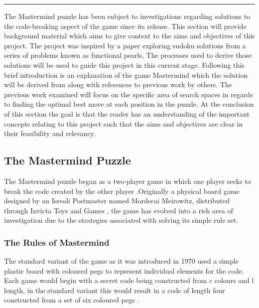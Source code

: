 
\rule{\textwidth}{2pt}

The Mastermind puzzle has been subject to investigations regarding solutions to the code-breaking aspect of the game
since its release.
This section will provide background material which aims to give context to the aims and objectives of this project.
The project was inspired by a paper exploring sudoku solutions from a series of problems known as functional pearls,
The processes used to derive those solutions will be used to guide this project in this current stage.
Following this brief introduction is an explanation of the game Mastermind which the solution will be derived from along
with references to previous work by others. The previous work examined will focus on the specific area of search spaces
in regards to finding the optimal best move at each position in the puzzle. At the conclusion of this section the goal is
that the reader has an understanding of the important concepts relating to this project such that the aims and objectives
are clear in their feasibility and relevancy.

\subsection {The Mastermind Puzzle}

The Mastermind puzzle began as a two-player game in which one player seeks to break the code created by the other player \cite{Wolfram}.Originally a physical board game designed by an Isreali Postmaster named Mordecai Meirowitz, distributed through Invicta Toys and Games \cite{Invicta}, the game has evolved into a rich area of investigation due to the strategies
associated with solving its simple rule set.

\subsubsection {The Rules of Mastermind}

The standard variant of the game as it was introduced in 1970 used a simple plastic board with coloured pegs to represent individual elements for the code.
Each game would begin with a secret code being constructed from c colours and l length, in the standard variant this would result in a code of length four constructed from a set
of six coloured pegs \cite{Wolfram}.

